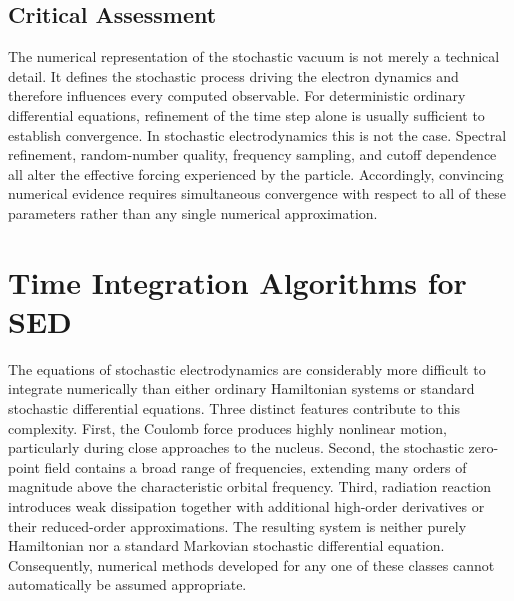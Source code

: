 \subsection*{Critical Assessment}
The numerical representation of the stochastic vacuum is not merely a
technical detail. It defines the stochastic process driving the electron
dynamics and therefore influences every computed observable.
For deterministic ordinary differential equations, refinement of the
time step alone is usually sufficient to establish convergence. In
stochastic electrodynamics this is not the case. Spectral refinement,
random-number quality, frequency sampling, and cutoff dependence all
alter the effective forcing experienced by the particle.
Accordingly, convincing numerical evidence requires simultaneous
convergence with respect to all of these parameters rather than any
single numerical approximation.
\section{Time Integration Algorithms for SED}
\label{sec:TimeIntegration}
The equations of stochastic electrodynamics are considerably more
difficult to integrate numerically than either ordinary Hamiltonian
systems or standard stochastic differential equations.
Three distinct features contribute to this complexity.
First,
the Coulomb force produces highly nonlinear motion, particularly during
close approaches to the nucleus.
Second,
the stochastic zero-point field contains a broad range of frequencies,
extending many orders of magnitude above the characteristic orbital
frequency.
Third,
radiation reaction introduces weak dissipation together with additional
high-order derivatives or their reduced-order approximations.
The resulting system is neither purely Hamiltonian nor a standard
Markovian stochastic differential equation.
Consequently, numerical methods developed for any one of these classes
cannot automatically be assumed appropriate.

